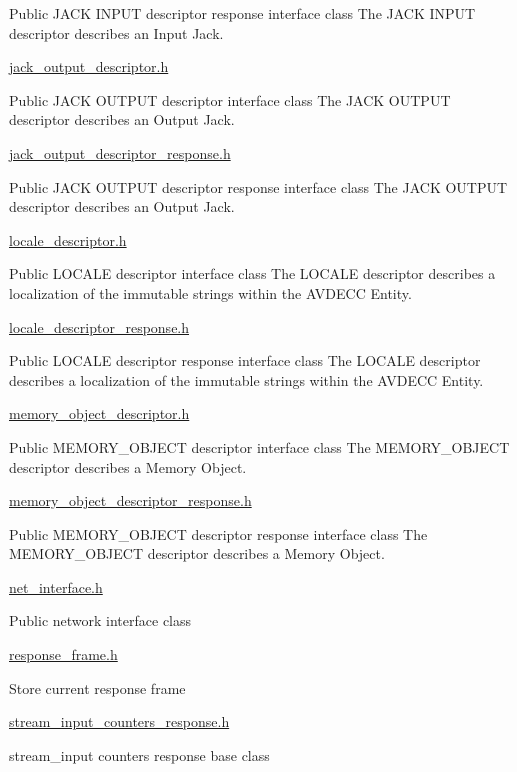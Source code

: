 Public J\+A\+CK I\+N\+P\+UT descriptor response interface class The J\+A\+CK I\+N\+P\+UT descriptor describes an Input Jack.

\hyperlink{jack__output__descriptor_8h}{jack\+\_\+output\+\_\+descriptor.\+h}

Public J\+A\+CK O\+U\+T\+P\+UT descriptor interface class The J\+A\+CK O\+U\+T\+P\+UT descriptor describes an Output Jack.

\hyperlink{jack__output__descriptor__response_8h}{jack\+\_\+output\+\_\+descriptor\+\_\+response.\+h}

Public J\+A\+CK O\+U\+T\+P\+UT descriptor response interface class The J\+A\+CK O\+U\+T\+P\+UT descriptor describes an Output Jack.

\hyperlink{locale__descriptor_8h}{locale\+\_\+descriptor.\+h}

Public L\+O\+C\+A\+LE descriptor interface class The L\+O\+C\+A\+LE descriptor describes a localization of the immutable strings within the A\+V\+D\+E\+CC Entity.

\hyperlink{locale__descriptor__response_8h}{locale\+\_\+descriptor\+\_\+response.\+h}

Public L\+O\+C\+A\+LE descriptor response interface class The L\+O\+C\+A\+LE descriptor describes a localization of the immutable strings within the A\+V\+D\+E\+CC Entity.

\hyperlink{memory__object__descriptor_8h}{memory\+\_\+object\+\_\+descriptor.\+h}

Public M\+E\+M\+O\+R\+Y\+\_\+\+O\+B\+J\+E\+CT descriptor interface class The M\+E\+M\+O\+R\+Y\+\_\+\+O\+B\+J\+E\+CT descriptor describes a Memory Object.

\hyperlink{memory__object__descriptor__response_8h}{memory\+\_\+object\+\_\+descriptor\+\_\+response.\+h}

Public M\+E\+M\+O\+R\+Y\+\_\+\+O\+B\+J\+E\+CT descriptor response interface class The M\+E\+M\+O\+R\+Y\+\_\+\+O\+B\+J\+E\+CT descriptor describes a Memory Object.

\hyperlink{net__interface_8h}{net\+\_\+interface.\+h}

Public network interface class

\hyperlink{response__frame_8h}{response\+\_\+frame.\+h}

Store current response frame

\hyperlink{stream__input__counters__response_8h}{stream\+\_\+input\+\_\+counters\+\_\+response.\+h}

stream\+\_\+input counters response base class

